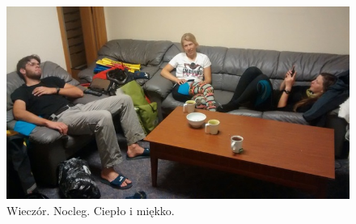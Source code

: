 \begin{figure}[t!]
	\centering
	\includegraphics[width=.9\linewidth]{./photos/x-s-2014-08-17_23-52-35__112.jpg}
	\caption*{Wieczór. Nocleg. Ciepło i miękko.}
	\label{img:exhaustion}
\end{figure}%

\vfill

\pagebreak
